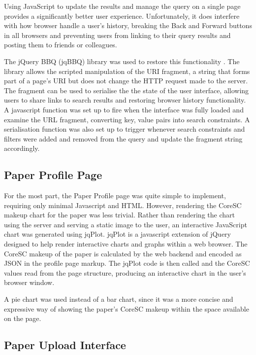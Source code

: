 Using JavaScript to update the results and manage the query on a single page
provides a significantly better user experience. Unfortunately, it does
interfere with how browser handle a user's history, breaking the Back and
Forward buttons in all browsers and preventing users from linking to their
query results and posting them to friends or colleagues.

The jQuery BBQ (jqBBQ) library was used to restore this functionality
\cite{jqbbq2013}. The library allows the scripted manipulation of the URI
fragment, a string that forms part of a page's URI but does not change the HTTP
request made to the server\cite{urifragment2013}. The fragment can be used to
serialise the the state of the user interface, allowing users to share links to
search results and restoring browser history functionality. A javascript
function was set up to fire when the interface was fully loaded and examine the
URL fragment, converting key, value pairs into search constraints. A
serialisation function was also set up to trigger whenever search constraints
and filters were added and removed from the query and update the fragment
string accordingly.

\subsection{ Paper Profile Page }

For the most part, the Paper Profile page was quite simple to implement,
requiring only minimal Javascript and HTML. However, rendering the CoreSC
makeup chart for the paper was less trivial. Rather than rendering the chart
using the server and serving a static image to the user, an interactive
JavaScript chart was generated using jqPlot. jqPlot is a javascript extension
of jQuery designed to help render interactive charts and graphs within a web
browser\cite{jqplot2013}. The CoreSC makeup of the paper is calculated by the
web backend and encoded as JSON in the profile page markup. The jqPlot code is
then called and the CoreSC values read from the page structure, producing an
interactive chart in the user's browser window. 

A pie chart was used instead of a bar chart, since it was a more concise and
expressive way of showing the paper's CoreSC makeup within the space available
on the page.

\subsection{ Paper Upload Interface }

